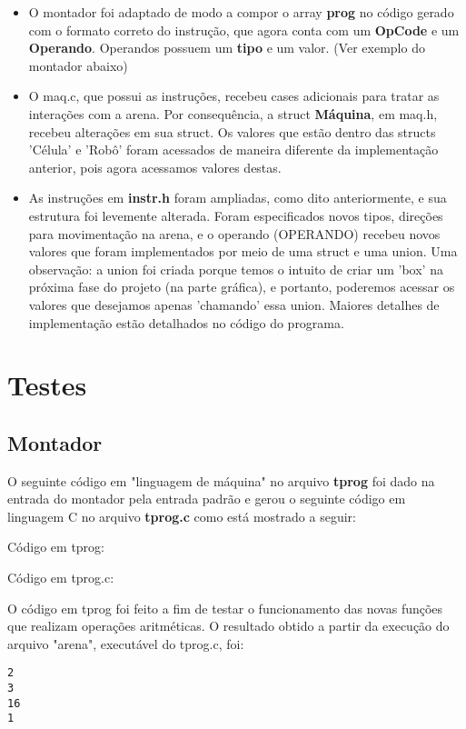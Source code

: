 \documentclass[12pt, a4paper]{article}
\begin{document}
\begin{itemize}

\item O montador foi adaptado de modo a compor o array \textbf{prog} no código gerado com o formato correto do instrução, que agora conta com um \textbf{OpCode} e um \textbf{Operando}. Operandos possuem um \textbf{tipo} e um valor. (Ver exemplo do montador abaixo)
\item O maq.c, que possui as instruções, recebeu cases adicionais para
tratar as interações com a arena. Por consequência, a struct \textbf{Máquina}, em maq.h, recebeu alterações em sua struct. Os valores que estão
dentro das structs 'Célula' e 'Robô' foram acessados de maneira
diferente da implementação anterior, pois agora acessamos valores
destas.
\item As instruções em \textbf{instr.h} foram ampliadas, como dito anteriormente, e sua estrutura foi levemente alterada. Foram especificados
novos tipos, direções para movimentação na arena, e o operando
(OPERANDO) recebeu novos valores que foram implementados por meio
de uma struct e uma union. Uma observação: a union foi criada
porque temos o intuito de criar um 'box' na próxima fase do
projeto (na parte gráfica), e portanto, poderemos acessar os
valores que desejamos apenas 'chamando' essa union.
Maiores detalhes de implementação estão detalhados no código do
programa.
\end{itemize}

\section{Testes}
\subsection{Montador}
O seguinte código em "linguagem de máquina" no arquivo \textbf{tprog} foi dado na entrada do montador pela entrada padrão e gerou o seguinte código em linguagem C no arquivo \textbf{tprog.c} como está mostrado a seguir:
\begin{center}
Código em tprog:


Código em tprog.c:

\end{center}
O código em tprog foi feito a fim de testar o funcionamento das novas funções que realizam operações aritméticas. O resultado obtido a partir da execução do arquivo "arena", executável do tprog.c, foi:
\begin{lstlisting}
2
3
16
1
\end{lstlisting}
\end{document}
